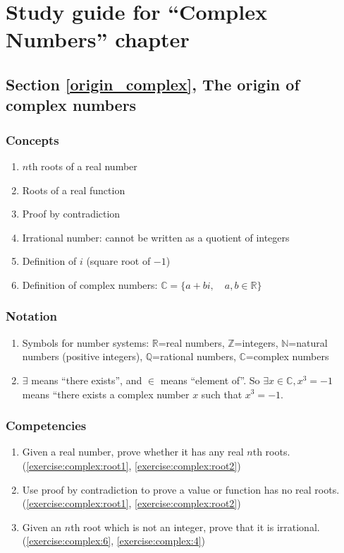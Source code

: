 \section{Study guide  for ``Complex Numbers''  chapter}\label{sec:complex:study} 
\subsection*{Section \ref{origin_complex}, The origin of complex numbers}
\subsubsection*{Concepts}
\begin{enumerate}
\item 
$n$th roots of a real number
\item
Roots of a real function
\item
Proof by contradiction
\item
Irrational number: cannot be written as a quotient of integers
\item
Definition of $i$ (square root of $-1$)
\item
Definition of complex numbers:  $\mathbb{C}=\{a+bi, \quad a,b \in \mathbb{R} \}$
\end{enumerate}

\subsubsection*{Notation}
\begin{enumerate}
\item
Symbols for number systems: $\mathbb{R}$=real numbers, $\mathbb{Z}$=integers, $\mathbb{N}$=natural numbers (positive integers), $\mathbb{Q}$=rational numbers, $\mathbb{C}$=complex numbers
\item $\exists$ means ``there exists'',  and $\in$ means ``element of''. So $\exists x \in \mathbb{C}, x^3 = -1$ means ``there exists a complex number $x$ such that $x^3=-1$.
\end{enumerate}

\subsubsection*{Competencies}
\begin{enumerate}
\item
Given a real number, prove whether it has any real $n$th roots.  (\ref{exercise:complex:root1}, \ref{exercise:complex:root2}) 
\item
Use proof by contradiction to prove a value or function has no real roots. (\ref{exercise:complex:root1}, \ref{exercise:complex:root2})
\item	
Given an $n$th root which is not an integer, prove that it is irrational. (\ref{exercise:complex:6}, \ref{exercise:complex:4})
\end{enumerate}


